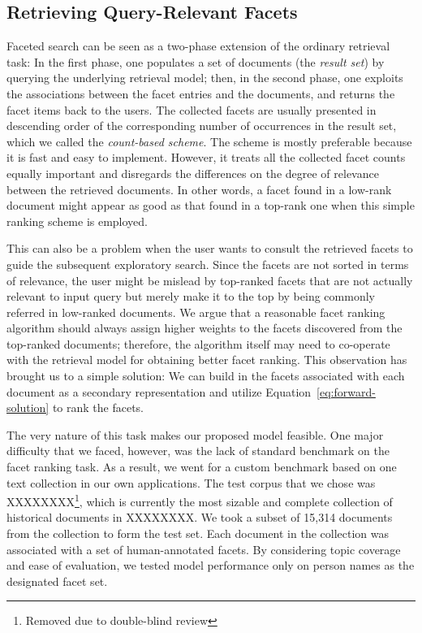 \subsection{Retrieving Query-Relevant Facets}\label{s:facet-ranking}

Faceted search \cite{hearst2002finding,yee2003faceted,roy2008minimum} can be
seen as a two-phase extension of the ordinary retrieval task: In the first
phase, one populates a set of documents (the \emph{result set}) by querying the
underlying retrieval model; then, in the second phase, one exploits the
associations between the facet entries and the documents, and returns the facet
items back to the users.  The collected facets are usually presented in
descending order of the corresponding number of occurrences in the result set,
which we called the \emph{count-based scheme}.  The scheme is mostly preferable
because it is fast and easy to implement.  However, it treats all the collected
facet counts equally important and disregards the differences on the degree of
relevance between the retrieved documents.  In other words, a facet found in a
low-rank document might appear as good as that found in a top-rank one when
this simple ranking scheme is employed.

This can also be a problem when the user wants to consult the retrieved facets
to guide the subsequent exploratory search.  Since the facets are not sorted in
terms of relevance, the user might be mislead by top-ranked facets that are not
actually relevant to input query but merely make it to the top by being
commonly referred in low-ranked documents.  We argue that a reasonable facet
ranking algorithm should always assign higher weights to the facets discovered
from the top-ranked documents; therefore, the algorithm itself may need to
co-operate with the retrieval model for obtaining better facet ranking.  This
observation has brought us to a simple solution: We can build in the facets
associated with each document as a secondary representation and utilize
Equation~\ref{eq:forward-solution} to rank the facets.  


The very nature of this task makes our proposed model feasible.  One major
difficulty that we faced, however, was the lack of standard benchmark on the
facet ranking task.  As a result, we went for a custom benchmark based on one
text collection in our own applications.  The test corpus that we chose was
XXXXXXXX\footnote{Removed due to double-blind review}, which is currently the
most sizable and complete collection of historical documents in XXXXXXXX.  We
took a subset of 15,314 documents from the collection to form the test set.
Each document in the collection was associated with a set of human-annotated
facets.  By considering topic coverage and ease of evaluation, we tested model
performance only on person names as the designated facet set.

